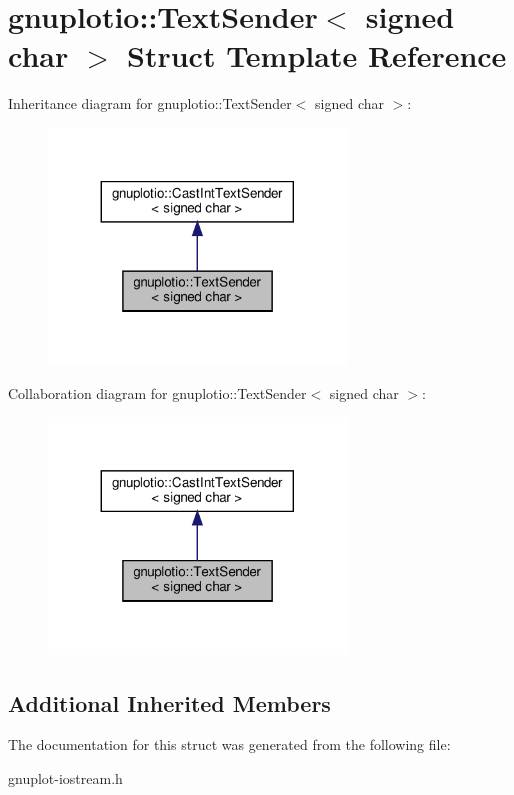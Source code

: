 \hypertarget{structgnuplotio_1_1TextSender_3_01signed_01char_01_4}{}\section{gnuplotio\+:\+:Text\+Sender$<$ signed char $>$ Struct Template Reference}
\label{structgnuplotio_1_1TextSender_3_01signed_01char_01_4}


Inheritance diagram for gnuplotio\+:\+:Text\+Sender$<$ signed char $>$\+:
\nopagebreak
\begin{figure}[H]
\begin{center}
\leavevmode
\includegraphics[width=224pt]{structgnuplotio_1_1TextSender_3_01signed_01char_01_4__inherit__graph}
\end{center}
\end{figure}


Collaboration diagram for gnuplotio\+:\+:Text\+Sender$<$ signed char $>$\+:
\nopagebreak
\begin{figure}[H]
\begin{center}
\leavevmode
\includegraphics[width=224pt]{structgnuplotio_1_1TextSender_3_01signed_01char_01_4__coll__graph}
\end{center}
\end{figure}
\subsection*{Additional Inherited Members}


The documentation for this struct was generated from the following file\+:\begin{DoxyCompactItemize}
\item 
gnuplot-\/iostream.\+h\end{DoxyCompactItemize}
